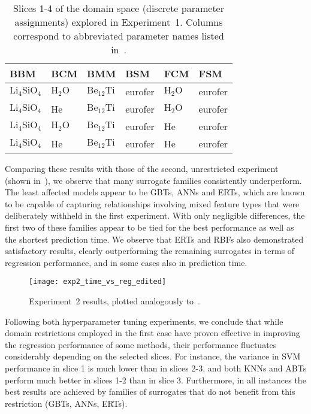 \begin{table}[h]
	\centering
	\setlength\tabcolsep{5pt}
	\renewcommand{\arraystretch}{0.95}
	{\footnotesize
		\begin{tabular}{llllll}
		\toprule
		BBM & BCM & BMM & BSM & FCM & FSM \\
		\midrule
		$\text{Li}_4\text{SiO}_4$ & $\text{H}_2\text{O}$ & $\text{Be}_{12}\text{Ti}$ & eurofer & $\text{H}_2\text{O}$ & eurofer\\
		$\text{Li}_4\text{SiO}_4$ & He & $\text{Be}_{12}\text{Ti}$ & eurofer & $\text{H}_2\text{O}$ & eurofer\\
		$\text{Li}_4\text{SiO}_4$ & $\text{H}_2\text{O}$ & $\text{Be}_{12}\text{Ti}$ & eurofer & He & eurofer\\
		$\text{Li}_4\text{SiO}_4$ & He & $\text{Be}_{12}\text{Ti}$ & eurofer & He & eurofer\\
		\bottomrule
		\end{tabular}
	}
	\caption{Slices 1-4 of the domain space (discrete parameter
	assignments) explored in Experiment~1. Columns correspond to abbreviated
	parameter names listed in~.}
	\label{tbl:slices}
\end{table}

Comparing these results with those of the second, unrestricted experiment (shown
in~), we observe that many surrogate families
consistently underperform. The least affected models appear to be GBTs, ANNs and
ERTs, which are known to be capable of capturing relationships involving mixed
feature types that were deliberately withheld in the first experiment. With only
negligible differences, the first two of these families appear to be tied for
the best performance as well as the shortest prediction time. We observe that
ERTs and RBFs also demonstrated satisfactory results, clearly outperforming the
remaining surrogates in terms of regression performance, and in some cases also
in prediction time.

\begin{figure}
	\centering

	\hspace*{-0.1\columnwidth}
	\texttt{[image: exp2\_time\_vs\_reg\_edited]}
	\caption{\label{fig:exp2-time-vs-reg}Experiment~2 results, plotted analogously
	to~.}
\end{figure}

Following both hyperparameter tuning experiments, we conclude that while domain
restrictions employed in the first case have proven effective in improving the
regression performance of some methods, their performance fluctuates considerably
depending on the selected slices. For instance, the variance in SVM performance
in slice 1 is much lower than in slices 2-3, and both KNNs and ABTs perform much
better in slices 1-2 than in slice 3. Furthermore, in all instances the best
results are achieved by families of surrogates that do not benefit from this
restriction (GBTs, ANNs, ERTs).



